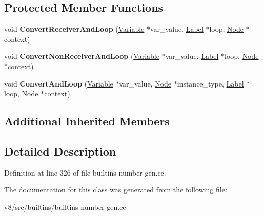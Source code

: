 \subsection*{Protected Member Functions}
\begin{DoxyCompactItemize}
\item 
\mbox{\label{classv8_1_1internal_1_1AddStubAssembler_aa0f2c967e23a87aeee16d48ee31eb125}} 
void {\bfseries Convert\+Receiver\+And\+Loop} (\mbox{\hyperlink{classv8_1_1internal_1_1compiler_1_1CodeAssemblerVariable}{Variable}} $\ast$var\+\_\+value, \mbox{\hyperlink{classv8_1_1internal_1_1compiler_1_1CodeAssemblerLabel}{Label}} $\ast$loop, \mbox{\hyperlink{classv8_1_1internal_1_1compiler_1_1Node}{Node}} $\ast$context)
\item 
\mbox{\label{classv8_1_1internal_1_1AddStubAssembler_afbd25110430918c56edff9b9550c6e16}} 
void {\bfseries Convert\+Non\+Receiver\+And\+Loop} (\mbox{\hyperlink{classv8_1_1internal_1_1compiler_1_1CodeAssemblerVariable}{Variable}} $\ast$var\+\_\+value, \mbox{\hyperlink{classv8_1_1internal_1_1compiler_1_1CodeAssemblerLabel}{Label}} $\ast$loop, \mbox{\hyperlink{classv8_1_1internal_1_1compiler_1_1Node}{Node}} $\ast$context)
\item 
\mbox{\label{classv8_1_1internal_1_1AddStubAssembler_a842a08b11f2baa6d51af91688489c6f5}} 
void {\bfseries Convert\+And\+Loop} (\mbox{\hyperlink{classv8_1_1internal_1_1compiler_1_1CodeAssemblerVariable}{Variable}} $\ast$var\+\_\+value, \mbox{\hyperlink{classv8_1_1internal_1_1compiler_1_1Node}{Node}} $\ast$instance\+\_\+type, \mbox{\hyperlink{classv8_1_1internal_1_1compiler_1_1CodeAssemblerLabel}{Label}} $\ast$loop, \mbox{\hyperlink{classv8_1_1internal_1_1compiler_1_1Node}{Node}} $\ast$context)
\end{DoxyCompactItemize}
\subsection*{Additional Inherited Members}


\subsection{Detailed Description}


Definition at line 326 of file builtins-\/number-\/gen.\+cc.



The documentation for this class was generated from the following file\+:\begin{DoxyCompactItemize}
\item 
v8/src/builtins/builtins-\/number-\/gen.\+cc\end{DoxyCompactItemize}
